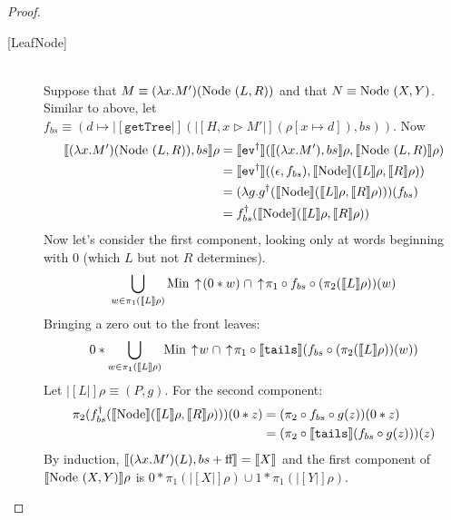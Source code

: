 \begin{proof}
\begin{description}
\item[{[}LeafNode{]}] \hfill \\ 
Suppose that $M\equiv (\lambda x.M')(\textrm{Node }(L,R))$ and that $N\equiv \textrm{Node }(X,Y)$.   Similar to above, let ${f_{bs}\equiv (d\mapsto |[\texttt{getTree}|](|[H,x\triangleright M'|](\rho[x\mapsto d]), bs))}$.  Now
\begin{align*}
|[(\lambda x.M')(\textrm{Node }(L,R)), bs|]\rho &=
|[\texttt{ev}^\dagger|](|[(\lambda x.M'), bs|]\rho, 
|[\textrm{Node }(L,R)|]\rho) \\
&= |[\texttt{ev}^\dagger|]((\epsilon, f_{bs}), 
|[\textrm{Node }\!\!|](|[L|]\rho, |[R|]\rho)) \\
&= (\lambda g.g^{\dagger}(|[\textrm{Node }\!\!|](|[L|]\rho, |[R|]\rho)))(f_{bs}) \\
&= f_{bs}^{\dagger}
(|[\textrm{Node }\!\!|](|[L|]\rho, |[R|]\rho))
\end{align*}
Now let's consider the first component, looking only at words beginning with $0$ (which $L$ but not $R$ determines). 
\begin{displaymath}
\bigcup_{w\in \pi_1(|[L|]\rho)} \textrm{Min} \,\uparrow\! (0*w) \;\cap 
\,\uparrow\! \pi_1\circ f_{bs} \circ (\pi_2(|[L|]\rho))(w)
\end{displaymath}
Bringing a zero out to the front leaves:
\begin{displaymath}
0 * \bigcup_{w\in \pi_1(|[L|]\rho)} \textrm{Min} \,\uparrow\! w \;\cap 
\,\uparrow\! \pi_1\circ |[\texttt{tails}|](f_{bs} \circ (\pi_2(|[L|]\rho))(w))
\end{displaymath}
Let $|[L|]\rho \equiv (P,g)$.  For the second component:
\begin{align*}
\pi_2 (f_{bs}^{\dagger}
(|[\textrm{Node }\!\!|](|[L|]\rho, |[R|]\rho)))(0*z) &= 
(\pi_2\circ f_{bs}\circ g(z))(0*z) \\
&= (\pi_2\circ |[\texttt{tails}|](f_{bs}\circ g(z)))(z) 
\end{align*}
By induction, $|[(\lambda x.M')(L), bs+\textrm{ff }\!\!|] = |[X|]$ and the first component of $|[\textrm{Node }(X,Y)|]\rho$ is 
${0*\pi_1(|[X|]\rho)\cup 1*\pi_1(|[Y|]\rho)}$.


\end{description}
\end{proof}
